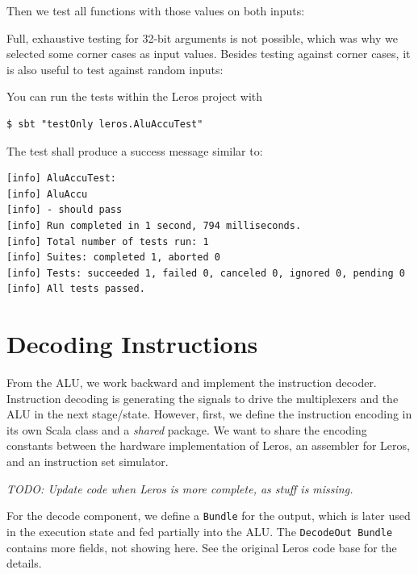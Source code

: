\documentclass[%
    10pt,
    headinclude, footexclude,
    openright, %
    notitlepage,
    cleardoubleempty,
    headsepline,
    pointlessnumbers,
    bibtotoc, idxtotoc,
    ]{scrbook}
\newcommand{\code}[1]{{\lstinline[basicstyle=\small\ttfamily]{#1}}}
\newcommand{\todo}[1]{{\emph{TODO: #1}}}
\begin{document}
\noindent Then we test all functions with those values on both inputs:


\noindent Full, exhaustive testing for 32-bit arguments is not possible, which was why we
selected some corner cases as input values. Besides testing against corner cases, it is also useful
to test against random inputs:


\noindent You can run the tests within the Leros project with

\begin{verbatim}
$ sbt "testOnly leros.AluAccuTest"
\end{verbatim}

The test shall produce a success message similar to:

\begin{verbatim}
[info] AluAccuTest:
[info] AluAccu
[info] - should pass
[info] Run completed in 1 second, 794 milliseconds.
[info] Total number of tests run: 1
[info] Suites: completed 1, aborted 0
[info] Tests: succeeded 1, failed 0, canceled 0, ignored 0, pending 0
[info] All tests passed.
\end{verbatim}

\section{Decoding Instructions}


From the ALU, we work backward and implement the instruction decoder.
Instruction decoding is generating the signals to drive the multiplexers
and the ALU in the next stage/state.
However, first, we define the instruction encoding in its own Scala class and
a \emph{shared} package. We want to share the encoding constants between
the hardware implementation of Leros, an assembler for Leros, and an instruction
set simulator.


\todo{Update code when Leros is more complete, as stuff is missing.}

\noindent For the decode component, we define a \code{Bundle} for the output,
which is later used in the execution state and fed partially into the ALU.
The \code{DecodeOut Bundle} contains more fields,
not showing here. See the original Leros code base for the details.
\end{document}
